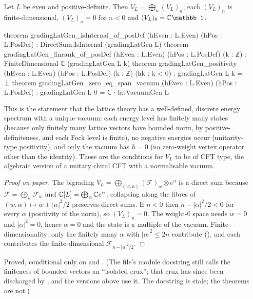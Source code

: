 \begin{theorem}\label{ch03:thm:gradingLat}
Let $L$ be even and positive-definite. Then $V_L=\bigoplus_n(V_L)_n$, each $(V_L)_n$ is
finite-dimensional, $(V_L)_n=0$ for $n<0$ and $(V_L)_0=\C\mathbb 1$.
\end{theorem}
\begin{leancode}
theorem gradingLatGen_isInternal_of_posDef (hEven : L.Even) (hPos : L.PosDef) :
    DirectSum.IsInternal (gradingLatGen L)
theorem gradingLatGen_finrank_of_posDef (hEven : L.Even) (hPos : L.PosDef) (k : ℤ) :
    FiniteDimensional ℂ (gradingLatGen L k)
theorem gradingLatGen_positivity (hEven : L.Even) (hPos : L.PosDef) (k : ℤ) (hk : k < 0) :
    gradingLatGen L k = ⊥
theorem gradingLatGen_zero_eq_span_vacuum (hEven : L.Even) (hPos : L.PosDef) :
    gradingLatGen L 0 = ℂ ∙ latVacuumGen L
\end{leancode}

\begin{physics}
This is the statement that the lattice theory has a well-defined, discrete energy spectrum with a unique vacuum: each energy level has finitely many states (because only finitely many lattice vectors have bounded norm, by positive-definiteness, and each Fock level is finite), no negative energies occur (unitarity-type positivity), and only the vacuum has $h=0$ (no zero-weight vertex operator other than the identity). These are the conditions for $V_L$ to be of CFT type, the algebraic version of a unitary chiral CFT with a normalisable vacuum.
\end{physics}
\begin{proof}[Proof on paper]
The bigrading $V_L=\bigoplus_{(w,\alpha)}(\mathcal F)_w\otimes e^\alpha$ is a direct sum because
$\mathcal F=\bigoplus_w\mathcal F_w$ and ${\mathbb{C}}[L]=\bigoplus_\alpha{\mathbb{C}} e^\alpha$; collapsing along the
fibres of $(w,\alpha)\mapsto w+|\alpha|^2/2$ preserves direct sums. If $n<0$ then
$n-|\alpha|^2/2<0$ for every $\alpha$ (positivity of the norm), so $(V_L)_n=0$. The weight-$0$
space needs $w=0$ and $|\alpha|^2=0$, hence $\alpha=0$ and the state is a multiple of the vacuum.
Finite-dimensionality: only the finitely many $\alpha$ with $|\alpha|^2\le2n$ contribute
(), and each contributes the finite-dimensional $\mathcal F_{n-|\alpha|^2/2}$.
\end{proof}
\begin{status}
Proved, conditional only on  and . (The file's module docstring still
calls the finiteness of bounded vectors an ``isolated crux''; that crux has since been
discharged by , and the  versions above use it. The
docstring is stale; the theorems are not.)
\end{status}

